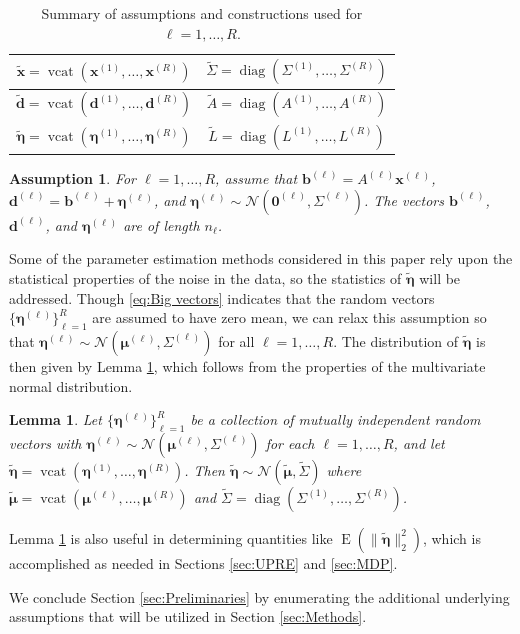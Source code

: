 \documentclass[12pt]{article}
\newcommand{\bVec}{\mathbf{b}}	%
\newcommand{\dVec}{\mathbf{d}}	%
\newcommand{\xVec}{\mathbf{x}}	%
\DeclareMathOperator{\diag}{diag}	%
\DeclareMathOperator{\vcat}{vcat}	%
\newcommand{\noise}{\eta}	%
\newcommand{\noiseVec}{\bm{\noise}}	%
\DeclareMathOperator{\E}{E}	%
\newcommand{\zeroVec}{\bm{0}}	%
\newtheorem{assumption}{Assumption}
\newtheorem{lemma}{Lemma}[section]
\begin{document}
\begin{table}[ht!]
  \begin{center}
    \caption{Summary of assumptions and constructions used for $\ell = 1,\ldots,R$.}
    \label{tab:System assumptions}
    \begin{tabular}{|c|c|}
    \hline
    $\widetilde{\xVec} = \vcat\left(\xVec^{(1)},\ldots,\xVec^{(R)}\right)$ & $\widetilde{\Sigma} = \diag\left(\Sigma^{(1)},\ldots,\Sigma^{(R)}\right)$ \\
    \hline
    $\widetilde{\dVec} = \vcat\left(\dVec^{(1)},\ldots,\dVec^{(R)}\right)$ & $\widetilde{A} = \diag\left(A^{(1)},\ldots,A^{(R)}\right)$ \\
    \hline
    $\widetilde{\noiseVec} = \vcat\left(\noiseVec^{(1)},\ldots,\noiseVec^{(R)}\right)$ & $\widetilde{L} = \diag\left(L^{(1)},\ldots,L^{(R)}\right)$ \\
    \hline
    \end{tabular}
  \end{center}
\end{table}

\begin{assumption}
\label{Assumption_System}
For $\ell = 1,\ldots,R$, assume that $\bVec^{(\ell)} = {A^{(\ell)}}\xVec^{(\ell)}$, $\dVec^{(\ell)} = \bVec^{(\ell)} + \noiseVec^{(\ell)}$, and $\noiseVec^{(\ell)} \sim \mathcal{N}(\zeroVec^{(\ell)},\Sigma^{(\ell)})$. The vectors $\bVec^{(\ell)}$, $\dVec^{(\ell)}$, and $\noiseVec^{(\ell)}$ are of length $n_\ell$.
\end{assumption}

Some of the parameter estimation methods considered in this paper rely upon the statistical properties of the noise in the data, so the statistics of $\widetilde{\noiseVec}$ will be addressed. Though \eqref{eq:Big vectors} indicates that the random vectors $\{\noiseVec^{(\ell)}\}_{\ell=1}^R$ are assumed to have zero mean, we can relax this assumption so that $\noiseVec^{(\ell)} \sim \mathcal{N}(\bm{\mu}^{(\ell)},\Sigma^{(\ell)})$ for all $\ell = 1,\ldots,R$. The distribution of $\widetilde{\noiseVec}$ is then given by Lemma \ref{lem:Concatenation of Normal Noise}, which follows from the properties of the multivariate normal distribution. 
\begin{lemma}
\label{lem:Concatenation of Normal Noise}
Let $\{\noiseVec^{(\ell)}\}_{\ell=1}^R$ be a collection of mutually independent random vectors with $\noiseVec^{(\ell)} \sim \mathcal{N}(\bm{\mu}^{(\ell)},\Sigma^{(\ell)})$ for each $\ell = 1,\ldots,R$, and let $\widetilde{\noiseVec} = \vcat(\noiseVec^{(1)},\ldots,\noiseVec^{(R)})$. Then $\widetilde{\noiseVec} \sim \mathcal{N}(\widetilde{\bm{\mu}},\widetilde{\Sigma})$ where $\widetilde{\bm{\mu}} = \vcat(\bm{\mu}^{(\ell)},\ldots,\bm{\mu}^{(R)})$ and $\widetilde{\Sigma} = \diag(\Sigma^{(1)},\ldots,\Sigma^{(R)})$.
\end{lemma}
\noindent Lemma \ref{lem:Concatenation of Normal Noise} is also useful in determining quantities like $\E(\|\widetilde{\noiseVec}\|_2^2)$, which is accomplished as needed in Sections \ref{sec:UPRE} and \ref{sec:MDP}. \par
We conclude Section \ref{sec:Preliminaries} by enumerating the additional underlying assumptions that will be utilized in Section \ref{sec:Methods}.
\end{document}
